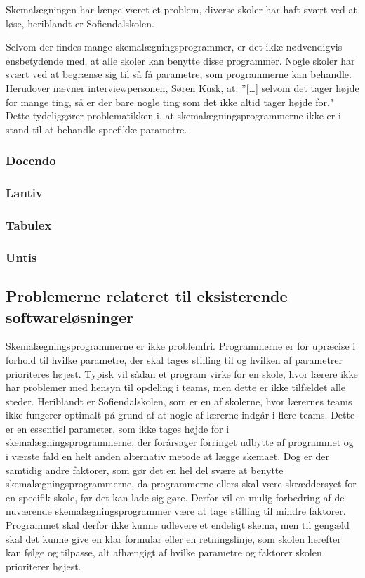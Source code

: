 Skemalægningen har længe været et problem, diverse skoler har haft svært ved at løse, heriblandt er Sofiendalskolen.

Selvom der findes mange skemalægningsprogrammer, er det ikke nødvendigvis ensbetydende med, at alle skoler kan benytte disse programmer. Nogle skoler har svært ved at begrænse sig til så få parametre, som programmerne kan behandle. Herudover nævner interviewpersonen, Søren Kusk, at: ”[…] selvom det tager højde for mange ting, så er der bare nogle ting som det ikke altid tager højde for." Dette tydeliggører problematikken i, at skemalægningsprogrammerne ikke er i stand til at behandle specfikke parametre.

  \subsubsection{Docendo}
    

  \subsubsection{Lantiv}
    

  \subsubsection{Tabulex}
    

  \subsubsection{Untis}
    

\subsection{Problemerne relateret til eksisterende softwareløsninger}
Skemalægningsprogrammerne er ikke problemfri. Programmerne er for upræcise i forhold til hvilke parametre, der skal tages stilling til og hvilken af parametrer prioriteres højest. Typisk vil sådan et program virke for en skole, hvor lærere ikke har problemer med hensyn til opdeling i teams, men dette er ikke tilfældet alle steder. Heriblandt er Sofiendalskolen, som er en af skolerne, hvor lærernes teams ikke fungerer optimalt på grund af at nogle af lærerne indgår i flere teams. Dette er en essentiel parameter, som ikke tages højde for i skemalægningsprogrammerne, der forårsager forringet udbytte af programmet og i værste fald en helt anden alternativ metode at lægge skemaet. Dog er der samtidig andre faktorer, som gør det en hel del svære at benytte skemalægningsprogrammerne, da programmerne ellers skal være skræddersyet for en specifik skole, før det kan lade sig gøre.
Derfor vil en mulig forbedring af de nuværende skemalægningsprogrammer være at tage stilling til mindre faktorer. Programmet skal derfor ikke kunne udlevere et endeligt skema, men til gengæld skal det kunne give en klar formular eller en retningslinje, som skolen herefter kan følge og tilpasse, alt afhængigt af hvilke parametre og faktorer skolen prioriterer højest.